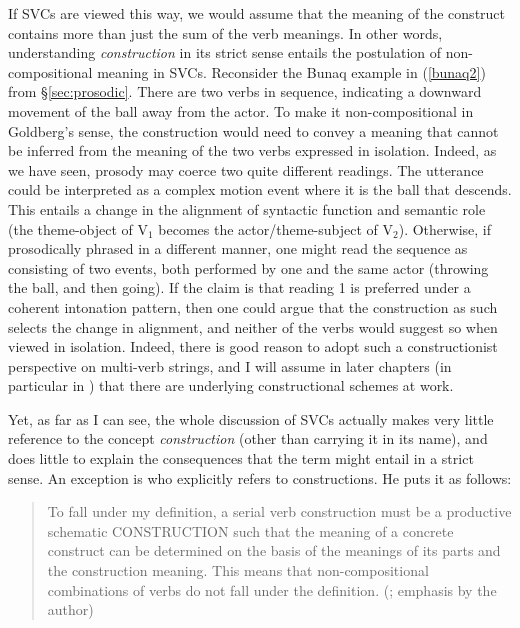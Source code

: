 If SVCs are viewed this way, we would assume that the meaning of the construct contains more than just the sum of the verb meanings. In other words, understanding \textit{construction} in its strict sense entails the postulation of non-com\-posi\-tion\-al meaning in SVCs. Reconsider the Bunaq example in (\ref{bunaq2}) from §\ref{sec:prosodic}. There are two verbs in sequence, indicating a downward movement of the ball away from the actor. To make it non-compositional in Goldberg's sense, the construction would need to convey a meaning that cannot be inferred from the meaning of the two verbs expressed in isolation. Indeed, as we have seen, prosody may coerce two quite different readings. The utterance could be interpreted as a complex motion event where it is the ball that descends. This entails a change in the alignment of syntactic function and semantic role (the theme-object of V$_1$ becomes the actor/theme-subject of V$_2$). Otherwise, if prosodically phrased in a different manner, one might read the sequence as consisting of two events, both performed by one and the same actor (throwing the ball, and then going). If the claim is that reading 1 is preferred under a coherent intonation pattern, then one could argue that the construction as such selects the change in alignment, and neither of the verbs would suggest so when viewed in isolation. Indeed, there is good reason to adopt such a constructionist perspective on multi-verb strings, and I will assume in later chapters (in particular in ) that there are underlying constructional schemes at work.

Yet, as far as I can see, the whole discussion of SVCs actually makes very little reference to the concept \textit{construction} (other than carrying it in its name), and does little to explain the consequences that the term might entail in a strict sense. An exception is \citet{haspelmath2016serial} who explicitly refers to constructions. He puts it as follows:

\begin{quote}To fall under my definition, a serial verb construction must be a productive schematic
CONSTRUCTION such that the meaning of a concrete construct can be determined on the basis of the meanings of its parts and the construction meaning. This means that non-compositional combinations of verbs do not fall under the definition. (\citealt[6]{haspelmath2016serial}; emphasis by the author) \end{quote}

